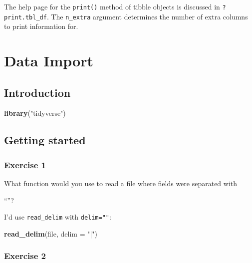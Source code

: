 \documentclass[]{book}
\newenvironment{Shaded}{\begin{snugshade}}{\end{snugshade}}
\newcommand{\DataTypeTok}[1]{\textcolor[rgb]{0.13,0.29,0.53}{#1}}
\newcommand{\KeywordTok}[1]{\textcolor[rgb]{0.13,0.29,0.53}{\textbf{#1}}}
\newcommand{\NormalTok}[1]{#1}
\newcommand{\StringTok}[1]{\textcolor[rgb]{0.31,0.60,0.02}{#1}}
\theoremstyle{plain}
\theoremstyle{remark}
\theoremstyle{definition}
\theoremstyle{definition}
\theoremstyle{definition}
\theoremstyle{remark}
\begin{document}
The help page for the \texttt{print()} method of tibble objects is
discussed in \texttt{?print.tbl\_df}. The \texttt{n\_extra} argument
determines the number of extra columns to print information for.

\hypertarget{data-import}{%
\chapter{Data Import}\label{data-import}}

\hypertarget{introduction-6}{%
\section{Introduction}\label{introduction-6}}

\begin{Shaded}
\begin{Highlighting}[]
\KeywordTok{library}\NormalTok{(}\StringTok{"tidyverse"}\NormalTok{)}
\end{Highlighting}
\end{Shaded}

\hypertarget{getting-started}{%
\section{Getting started}\label{getting-started}}

\hypertarget{exercise-1-19}{%
\subsection{Exercise 1}\label{exercise-1-19}}

What function would you use to read a file where fields were separated
with

``\textbar{}''?

I'd use \texttt{read\_delim} with \texttt{delim="\textbar{}"}:

\begin{Shaded}
\begin{Highlighting}[]
\KeywordTok{read_delim}\NormalTok{(file, }\DataTypeTok{delim =} \StringTok{"|"}\NormalTok{)}
\end{Highlighting}
\end{Shaded}

\hypertarget{exercise-2-18}{%
\subsection{Exercise 2}\label{exercise-2-18}}
\end{document}
